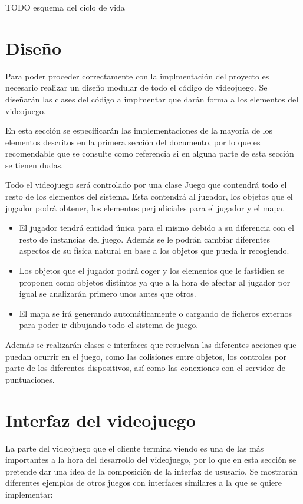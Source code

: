 \documentclass[palatino]{apuntes}
\begin{document}
TODO esquema del ciclo de vida


\section{Diseño}

Para poder proceder correctamente con la implmentación del proyecto es necesario realizar un diseño modular de todo el código de videojuego. Se diseñarán las clases del código a implmentar que darán forma a los elementos del videojuego.

En esta sección se especificarán las implementaciones de la mayoría de los elementos descritos en la primera sección del documento, por lo que es recomendable que se consulte como referencia si en alguna parte de esta sección se tienen dudas.

Todo el videojuego será controlado por una clase Juego que contendrá todo el resto de los elementos del sistema. Esta contendrá al jugador, los objetos que el jugador podrá obtener, los elementos perjudiciales para el jugador y el mapa.

\begin{itemize}
	\item El jugador tendrá entidad única para el mismo debido a su diferencia con el resto de instancias del juego. Además se le podrán cambiar diferentes aspectos de su física natural en base a los objetos que pueda ir recogiendo.
	\item Los objetos que el jugador podrá coger y los elementos que le fastidien se proponen como objetos distintos ya que a la hora de afectar al jugador por igual se analizarán primero unos antes que otros.
	\item El mapa se irá generando automáticamente o cargando de ficheros externos para poder ir dibujando todo el sistema de juego.
\end{itemize}

Además se realizarán clases e interfaces que resuelvan las diferentes acciones que puedan ocurrir en el juego, como las colisiones entre objetos, los controles por parte de los diferentes dispositivos, así como las conexiones con el servidor de puntuaciones.

\section{Interfaz del videojuego}
La parte del videojuego que el cliente termina viendo es una de las más importantes a la hora del desarrollo del videojuego, por lo que en esta sección se pretende dar una idea de la composición de la interfaz de ususario. Se mostrarán diferentes ejemplos de otros juegos con interfaces similares a la que se quiere implementar:
\end{document}
